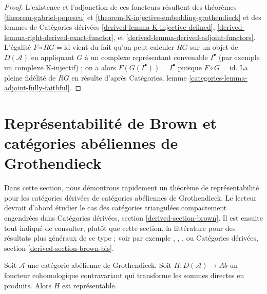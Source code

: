 \begin{proof}
L'existence et l'adjonction de ces foncteurs résultent des théorèmes
\ref{theorem-gabriel-popescu} et
\ref{theorem-K-injective-embedding-grothendieck}
et
des lemmes de Catégories dérivées
\ref{derived-lemma-K-injective-defined},
\ref{derived-lemma-right-derived-exact-functor}, et
\ref{derived-lemma-derived-adjoint-functors}.
L'égalité $F \circ RG = \text{id}$ vient du fait qu'on peut calculer $RG$ sur
un objet de $D(\mathcal{A})$ en appliquant $G$ à un complexe représentant
convenable $I^\bullet$ (par exemple un complexe K-injectif) ; on a alors
$F(G(I^\bullet)) = I^\bullet$ puisque $F \circ G = \text{id}$. La pleine
fidélité de $RG$ en résulte d'après Catégories, lemme
\ref{categories-lemma-adjoint-fully-faithful}.
\end{proof}





\section{Représentabilité de Brown et catégories abéliennes de Grothendieck}
\label{section-brown}

\noindent
Dans cette section, nous démontrons rapidement un théorème de représentabilité
pour les catégories dérivées de catégories abéliennes de Grothendieck. Le
lecteur devrait d'abord étudier le cas des catégories triangulées compactement
engendrées dans Catégories dérivées, section \ref{derived-section-brown}.
Il est ensuite tout indiqué de consulter, plutôt que cette section, la
littérature pour des résultats plus généraux de ce type ; voir par exemple
\cite{Franke}, \cite{Neeman}, \cite{Krause}, ou Catégories dérivées, section
\ref{derived-section-brown-bis}.

\begin{lemma}
\label{lemma-brown}
Soit $\mathcal{A}$ une catégorie abélienne de Grothendieck.
Soit $H : D(\mathcal{A}) \to \textit{Ab}$ un foncteur cohomologique
contravariant qui transforme les sommes directes en produits.
Alors $H$ est représentable.
\end{lemma}

